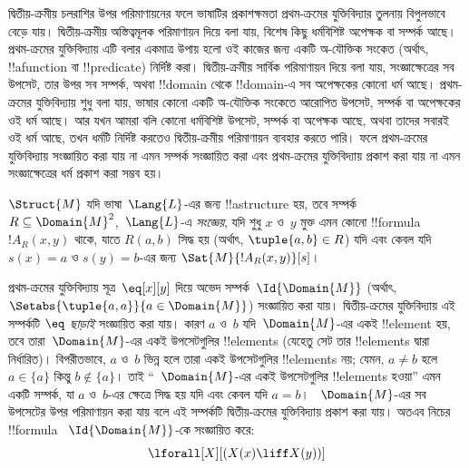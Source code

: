 \documentclass[../../../include/open-logic-section]{subfiles}
\begin{document}

\begin{explain}
দ্বিতীয়-ক্রমীয় চলরাশির উপর পরিমাণায়নের ফলে ভাষাটির প্রকাশক্ষমতা
প্রথম-ক্রমের যুক্তিবিদ্যার তুলনায় বিপুলভাবে বেড়ে যায়। দ্বিতীয়-ক্রমীয়
অস্তিত্বমূলক পরিমাণায়ন দিয়ে বলা যায়, বিশেষ কিছু ধর্মবিশিষ্ট অপেক্ষক বা
সম্পর্ক আছে। প্রথম-ক্রমের যুক্তিবিদ্যায় এটি বলার একমাত্র উপায় হলো ওই
কাজের জন্য একটি অ-যৌক্তিক সংকেত (অর্থাৎ, !!a{function} বা
!!{predicate}) নির্দিষ্ট করা। দ্বিতীয়-ক্রমীয় সার্বিক পরিমাণায়ন দিয়ে
বলা যায়, সংজ্ঞাক্ষেত্রের সব উপসেট, তার উপর সব সম্পর্ক, অথবা
!!{domain} থেকে !!{domain}-এ সব অপেক্ষকের কোনো ধর্ম আছে। প্রথম-ক্রমের
যুক্তিবিদ্যায় শুধু বলা যায়, ভাষার কোনো একটি অ-যৌক্তিক সংকেতে আরোপিত
উপসেট, সম্পর্ক বা অপেক্ষকের ওই ধর্ম আছে। আর যখন আমরা বলি কোনো
ধর্মবিশিষ্ট উপসেট, সম্পর্ক বা অপেক্ষক আছে, অথবা তাদের সবারই ওই ধর্ম আছে,
তখন ধর্মটি নির্দিষ্ট করতেও দ্বিতীয়-ক্রমীয় পরিমাণায়ন ব্যবহার করতে
পারি। ফলে প্রথম-ক্রমের যুক্তিবিদ্যায় সংজ্ঞায়িত করা যায় না এমন সম্পর্ক
সংজ্ঞায়িত করা এবং প্রথম-ক্রমের যুক্তিবিদ্যায় প্রকাশ করা যায় না এমন
সংজ্ঞাক্ষেত্রের ধর্ম প্রকাশ করা সম্ভব হয়।
\end{explain}

\begin{defn}
$\Struct{M}$ যদি ভাষা~$\Lang{L}$-এর জন্য !!a{structure} হয়, তবে
সম্পর্ক~$R \subseteq \Domain{M}^2$,~$\Lang{L}$-এ \emph{সংজ্ঞেয়}, যদি
শুধু $x$ ও~$y$ মুক্ত এমন কোনো !!{formula}~$!A_R(x, y)$ থাকে, যাতে
$R(a, b)$ সিদ্ধ হয় (অর্থাৎ, $\tuple{a,b} \in R$) যদি এবং কেবল যদি
$s(x) = a$ ও $s(y) = b$-এর জন্য $\Sat{M}{!A_R(x, y)}[s]$।
\end{defn}

\begin{ex}
প্রথম-ক্রমের যুক্তিবিদ্যায় সূত্র~$\eq[x][y]$ দিয়ে অভেদ
সম্পর্ক~$\Id{\Domain{M}}$ (অর্থাৎ, $\Setabs{\tuple{a,a}}{a \in
  \Domain{M}}$) সংজ্ঞায়িত করা যায়। দ্বিতীয়-ক্রমের যুক্তিবিদ্যায়
এই সম্পর্কটি \emph{$\eq$ ছাড়াই} সংজ্ঞায়িত করা যায়। কারণ $a$ ও~$b$
যদি~$\Domain{M}$-এর একই !!{element} হয়, তবে তারা~$\Domain{M}$-এর একই
উপসেটগুলির !!{element}s (যেহেতু সেট তার !!{element}s দ্বারা নির্ধারিত)।
বিপরীতভাবে, $a$ ও~$b$ ভিন্ন হলে তারা একই উপসেটগুলির !!{element}s নয়;
যেমন, $a \neq b$ হলে $a \in \{a\}$ কিন্তু $b \notin \{a\}$। তাই
“~$\Domain{M}$-এর একই উপসেটগুলির !!{element}s হওয়া” এমন একটি সম্পর্ক,
যা $a$ ও~$b$-এর ক্ষেত্রে সিদ্ধ হয় যদি এবং কেবল যদি $a = b$।
~$\Domain{M}$-এর সব উপসেটের উপর পরিমাণায়ন করা যায় বলে এই সম্পর্কটি
দ্বিতীয়-ক্রমের যুক্তিবিদ্যায় প্রকাশ করা যায়। অতএব নিচের !!{formula}
~$\Id{\Domain{M}}$-কে সংজ্ঞায়িত করে:
\[
\lforall[X][(X(x) \liff X(y))]
\]
\end{ex}
\end{document}
